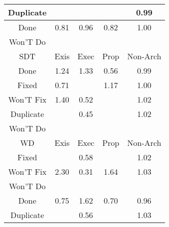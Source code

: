 \begin{tabular}{|c||c|c|c|c|}
\hline
Duplicate &  &  &  & \cellcolor[rgb]{0.9080204456661088,0.8306301094862486,0.4181524159550349} 0.99 \\ 
\hline
Done & \cellcolor[rgb]{0.874111669870272,0.6701285707192879,0.38650422521225397} 0.81 & \cellcolor[rgb]{0.9020253263085751,0.802253211193922,0.4125569712213367} 0.96 & \cellcolor[rgb]{0.8765427808123003,0.6816358291782213,0.3887732620914803} 0.82 & \cellcolor[rgb]{0.9090430380066804,0.8395467022136907,0.42} 1.00 \\ 
\hline
Won'T Do &  &  &  &  \\ 
\hline
\hline
SDT & Exis & Exec & Prop & Non-Arch \\ 
\hline
Done & \cellcolor[rgb]{0.8549948595216843,0.8139449334576399,0.41999999999999993} 1.24 & \cellcolor[rgb]{0.8343989910252446,0.8041889957488,0.41999999999999993} 1.33 & \cellcolor[rgb]{0.8269554168136599,0.44692230625132356,0.34249172235941594} 0.56 & \cellcolor[rgb]{0.9077319948719617,0.8292647757272852,0.4178831952138309} 0.99 \\ 
\hline
Fixed & \cellcolor[rgb]{0.8548978757526632,0.5791832785626054,0.3685713507024856} 0.71 &  & \cellcolor[rgb]{0.8709002843116674,0.8214790820423687,0.42} 1.17 & \cellcolor[rgb]{0.9096429503558,0.8398308712211684,0.42} 1.00 \\ 
\hline
Won'T Fix & \cellcolor[rgb]{0.818035037855012,0.7964376495102687,0.42} 1.40 & \cellcolor[rgb]{0.8199891471976563,0.41394863006890614,0.3359898707178125} 0.52 &  & \cellcolor[rgb]{0.9062453176479429,0.8382214662542886,0.42} 1.02 \\ 
\hline
Duplicate &  & \cellcolor[rgb]{0.8064903103019341,0.35005413542915453,0.32339095628180514} 0.45 &  & \cellcolor[rgb]{0.9054833224373159,0.8378605211545181,0.42} 1.02 \\ 
\hline
Won'T Do &  &  &  &  \\ 
\hline
\hline
WD & Exis & Exec & Prop & Non-Arch \\ 
\hline
Fixed &  & \cellcolor[rgb]{0.8320184318984102,0.47088724431914136,0.3472172031051828} 0.58 &  & \cellcolor[rgb]{0.904307938610833,0.8373037603946051,0.42} 1.02 \\ 
\hline
Won'T Fix & \cellcolor[rgb]{0.6127457762870652,0.6991953677149255,0.42} 2.30 & \cellcolor[rgb]{0.7811032206055393,0.229888577532886,0.2996963392318367} 0.31 & \cellcolor[rgb]{0.7630549436774579,0.7703944470051116,0.41999999999999993} 1.64 & \cellcolor[rgb]{0.9022448509053825,0.8363265083236022,0.42} 1.03 \\ 
\hline
Won'T Do &  &  &  &  \\ 
\hline
Done & \cellcolor[rgb]{0.8641431884930358,0.6229444255337028,0.37720030926016673} 0.75 & \cellcolor[rgb]{0.7683059603194979,0.7728817706776568,0.41999999999999993} 1.62 & \cellcolor[rgb]{0.8539889299309524,0.5748809350065085,0.367723001268889} 0.70 & \cellcolor[rgb]{0.9032834482850329,0.8082083218824891,0.41373121839936405} 0.96 \\ 
\hline
Duplicate &  & \cellcolor[rgb]{0.8282068626589749,0.45284581658581424,0.34365973848170983} 0.56 &  & \cellcolor[rgb]{0.903707668965918,0.8370194221417506,0.42} 1.03 \\ 
\hline
\end{tabular}